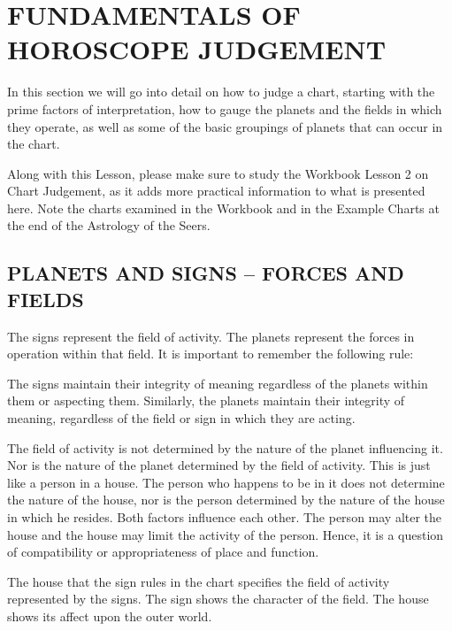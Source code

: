 \section{FUNDAMENTALS OF HOROSCOPE JUDGEMENT}
 

In this section we will go into detail on how to judge a chart, starting with the prime factors of interpretation, how to gauge the planets and the fields in which they operate, as well as some of the basic groupings of planets that can occur in the chart.

 

Along with this Lesson, please make sure to study the Workbook Lesson 2 on Chart Judgement, as it adds more practical information to what is presented here. Note the charts examined in the Workbook and in the Example Charts at the end of the Astrology of the Seers.

 



\subsection{PLANETS AND SIGNS – FORCES AND FIELDS}
 

The signs represent the field of activity. The planets represent the forces in operation within that field. It is important to remember the following rule:

 

The signs maintain their integrity of meaning regardless of the planets within them or aspecting them.
Similarly, the planets maintain their integrity of meaning, regardless of the field or sign in which they are acting.
 

The field of activity is not determined by the nature of the planet influencing it. Nor is the nature of the planet determined by the field of activity. This is just like a person in a house. The person who happens to be in it does not determine the nature of the house, nor is the person determined by the nature of the house in which he resides. Both factors influence each other. The person may alter the house and the house may limit the activity of the person. Hence, it is a question of compatibility or appropriateness of place and function.

 

The house that the sign rules in the chart specifies the field of activity represented by the signs. The sign shows the character of the field. The house shows its affect upon the outer world.
 

